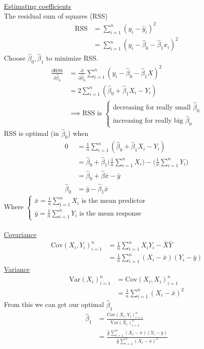 \documentclass[12pt, letterpaper]{article}
\begin{document}
\noindent \underline{Estimating coefficients} \\
The residual sum of squares (RSS) 
\begin{align*}
    \text{RSS} &= \sum_{i=1}^{n}(y_i-\hat y_i)^2 \\
    &= \sum_{i=1}^{n}(y_i-\hat \beta_0 - \hat \beta_1x_i)^2 
\end{align*}
Choose $\hat \beta_0, \hat \beta_1$ to minimize RSS.
\begin{align*}
    \frac{\partial \text{RSS}}{\partial \hat\beta_0} &= \frac{\partial}{\partial \hat\beta_0}  \sum_{i=1}^{n}(y_i-\hat \beta_0 - \hat \beta_1X)^2  \\
    &= 2\sum_{i=1}^{n}(\hat \beta_0+\hat \beta_1X_i-Y_i) \\
    &\implies \text{RSS is } \begin{cases}
        \text{decreasing for really small } \hat \beta_0 \\
        \text{increasing for really big } \hat \beta_0 
    \end{cases} 
\end{align*}
RSS is optimal (in $\hat \beta_0$) when 
\begin{align*}
    0 &= \frac 1n \sum_{i=1}^{n} (\hat \beta_0 + \hat \beta_1 X_i - Y_i) \\
    &= \hat \beta_0 + \hat \beta_1 \Big(\frac 1n \sum_{i=1}^{n}X_i\Big) - \Big(\frac 1n \sum_{i=1}^{n}Y_i\Big) \\ 
    &= \hat \beta_0 +\hat \beta \bar x - \bar y \\
    \hat \beta_0 &=\bar y - \hat \beta_1 \bar x 
\end{align*}
Where $\begin{cases}
    \bar x = \frac 1n \sum_{i=1}^{n}X_i \text{ is the mean predictor} \\
    \bar y = \frac 1n \sum_{i=1}^{n}Y_i \text{ is the mean response}
\end{cases}$ \\  \\
\underline{Covariance}
\begin{align*}
    \text{Cov}  (X_i, Y_i)^n_{i=1} &= \frac 1n \sum_{i=1}^{n}X_iY_i - \bar X \bar Y \\
    &= \frac 1n \sum_{i=1}^{n} (X_i - \bar x) (Y_i - \bar y)
\end{align*}
\underline{Variance}
    \begin{align*}
        \text{Var}(X_i)^n_{i=1} &= \text{Cov} (X_i,X_i)_{i=1}^n \\
        &= \frac 1n \sum_{i=1}^{n}(X_i - \bar x)^2
    \end{align*}
From this we can get our optimal $\hat \beta_1$
\begin{align*}
    \hat \beta_1 &= \frac{\text{Cov}(X_i,Y_i)_{i=1}^n}{\text{Var}(X_i)_{i=1}^n} \\ 
    &= \frac{\frac 1n \sum_{i=1}^{n}(X_i-\bar x)(Y_i-\bar y)}{\frac 1n \sum_{i=1}^{n} (X_i-\bar x)^2}
\end{align*}
\end{document}
